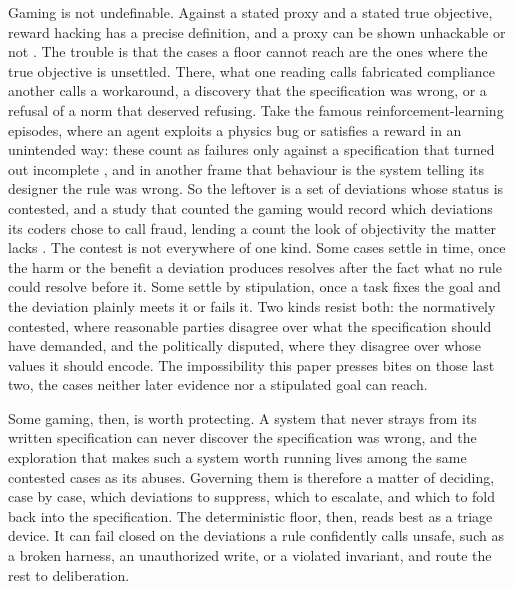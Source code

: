 \documentclass[11pt]{article}
\begin{document}
Gaming is not undefinable. Against a stated proxy and a stated true objective, reward hacking has a precise definition, and a proxy can be shown unhackable or not \citep{skalse2022}. The trouble is that the cases a floor cannot reach are the ones where the true objective is unsettled. There, what one reading calls fabricated compliance another calls a workaround, a discovery that the specification was wrong, or a refusal of a norm that deserved refusing. Take the famous reinforcement-learning episodes, where an agent exploits a physics bug or satisfies a reward in an unintended way: these count as failures only against a specification that turned out incomplete \citep{krakovna2020}, and in another frame that behaviour is the system telling its designer the rule was wrong. So the leftover is a set of deviations whose status is contested, and a study that counted the gaming would record which deviations its coders chose to call fraud, lending a count the look of objectivity the matter lacks \citep{porter1995}. The contest is not everywhere of one kind. Some cases settle in time, once the harm or the benefit a deviation produces resolves after the fact what no rule could resolve before it. Some settle by stipulation, once a task fixes the goal and the deviation plainly meets it or fails it. Two kinds resist both: the normatively contested, where reasonable parties disagree over what the specification should have demanded, and the politically disputed, where they disagree over whose values it should encode. The impossibility this paper presses bites on those last two, the cases neither later evidence nor a stipulated goal can reach.

Some gaming, then, is worth protecting. A system that never strays from its written specification can never discover the specification was wrong, and the exploration that makes such a system worth running lives among the same contested cases as its abuses. Governing them is therefore a matter of deciding, case by case, which deviations to suppress, which to escalate, and which to fold back into the specification. The deterministic floor, then, reads best as a triage device. It can fail closed on the deviations a rule confidently calls unsafe, such as a broken harness, an unauthorized write, or a violated invariant, and route the rest to deliberation.
\end{document}
